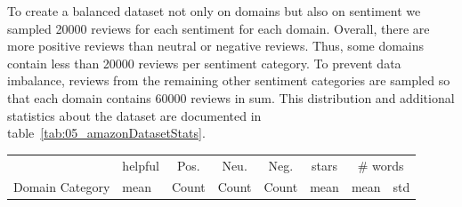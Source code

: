To create a balanced dataset not only on domains but also on sentiment we sampled 20000 reviews for each sentiment for each domain. Overall, there are more positive reviews than neutral or negative reviews. Thus, some domains contain less than 20000 reviews per sentiment category. To prevent data imbalance, reviews from the remaining other sentiment categories are sampled so that each domain contains 60000 reviews in sum. This distribution and additional statistics about the dataset are documented in table~\ref{tab:05_amazonDatasetStats}.
\begin{table}	
	\begin{tabularx}{\textwidth}{lXrrrcrr}
		
		\toprule
		{} & helpful & \multicolumn{1}{c}{Pos.} & \multicolumn{1}{c}{Neu.} & \multicolumn{1}{c}{Neg.} &\multicolumn{1}{c}{stars} & \multicolumn{2}{c}{\# words} \\
		Domain Category &         					mean &   	Count & Count & Count &  mean 	&  mean  &     std \\


\end{tabularx}
\end{table}
